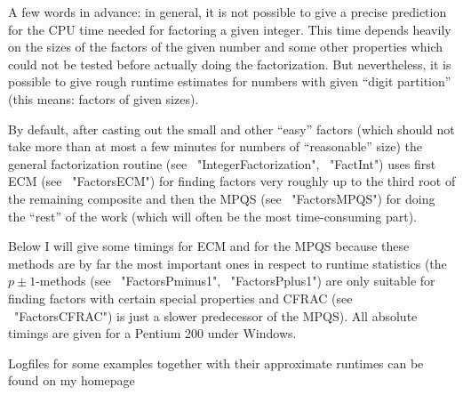 


A few words in advance: in general, it is not possible to give a precise
prediction for the CPU time needed for factoring a given integer.
This time depends heavily on the sizes of the factors of the given number
and some other properties which could not be tested before actually
doing the factorization.
But nevertheless, it is possible to give rough runtime estimates for
numbers with given ``digit partition'' (this means: factors of given
sizes).

By default, after casting out the small and other ``easy'' factors
(which should not take more than at most a few minutes for numbers of
``reasonable'' size) the general factorization routine 
(see ~"IntegerFactorization", ~"FactInt") uses first ECM
(see ~"FactorsECM") for finding factors very roughly up to the third root
of the remaining composite and then the MPQS (see ~"FactorsMPQS")
for doing the ``rest'' of the work (which will often be the most
time-consuming part).

Below I will give some timings for ECM and for the MPQS because
these methods are by far the most important ones in respect to
runtime statistics (the $p \pm 1$-methods (see ~"FactorsPminus1",
~"FactorsPplus1") are only suitable for finding factors with certain
special properties and CFRAC (see ~"FactorsCFRAC") is just a slower
predecessor of the MPQS). All absolute timings are given for a
Pentium 200 under Windows.

Logfiles for some examples together with their approximate runtimes
can be found on my homepage 


